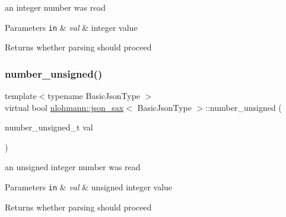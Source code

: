 an integer number was read 


\begin{DoxyParams}[1]{Parameters}
\mbox{\tt in}  & {\em val} & integer value \\
\hline
\end{DoxyParams}
\begin{DoxyReturn}{Returns}
whether parsing should proceed 
\end{DoxyReturn}
\mbox{\label{structnlohmann_1_1json__sax_ad9b253083e0509923ba195136f49face}} 
\subsubsection{\texorpdfstring{number\+\_\+unsigned()}{number\_unsigned()}}
{\footnotesize\ttfamily template$<$typename Basic\+Json\+Type $>$ \\
virtual bool \hyperlink{structnlohmann_1_1json__sax}{nlohmann\+::json\+\_\+sax}$<$ Basic\+Json\+Type $>$\+::number\+\_\+unsigned (\begin{DoxyParamCaption}\item[{number\+\_\+unsigned\+\_\+t}]{val }\end{DoxyParamCaption})\hspace{0.3cm}{\ttfamily [pure virtual]}}



an unsigned integer number was read 


\begin{DoxyParams}[1]{Parameters}
\mbox{\tt in}  & {\em val} & unsigned integer value \\
\hline
\end{DoxyParams}
\begin{DoxyReturn}{Returns}
whether parsing should proceed 
\end{DoxyReturn}
\mbox{\label{structnlohmann_1_1json__sax_a60287e3bd85f489e04c83f7e3b76e613}} 
